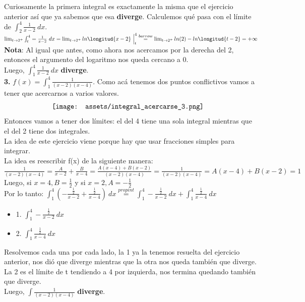 \documentclass[10pt,a4paper]{article}
\begin{document}
Curiosamente la primera integral es exactamente la misma que el ejercicio anterior así que ya sabemos que esa \textbf{diverge}. Calculemos qué pasa con el límite de $\int^{4}_{2} \frac{1}{x-2} \ dx$.\\
$\lim_{t \to 2^{+}} \int^{4}_{t} = \frac{1}{x-2} \ dx = \lim_{t \to 2^{+}} ln \longitud{x-2} \ \Big|^{4}_{t} \stackrel{barrow}{=} \lim_{t \to 2^{+}} ln(2) - ln \longitud{t-2} = + \infty $ \\
\textbf{Nota}: Al igual que antes, como ahora nos acercamos por la derecha del 2, entonces el argumento del logaritmo nos queda cercano a 0. \\
Luego, $\int^{4}_{1} \frac{1}{x-2} \ dx$ \textbf{diverge}. \\
\textbf{3.} $f(x) = \int^{4}_{1} \frac{1}{(x-2)(x-4)}$. Como acá tenemos dos puntos conflictivos vamos a tener que acercarnos a varios valores.
\[\begin{minipage}[b]{0.65\textwidth}
    \texttt{[image: assets/integral\_acercarse\_3.png]}
\end{minipage}\]
Entonces vamos a tener dos límites: el del 4 tiene una sola integral mientras que el del 2 tiene dos integrales. \\
La idea de este ejercicio viene porque hay que usar fracciones simples para integrar. \\
La idea es reescribir f(x) de la siguiente manera: $\frac{1}{(x-2)(x-4)} = \frac{A}{x-2} + \frac{B}{x-4} = \frac{A(x-4)+B(x-2)}{(x-2)(x-4)} = \frac{1}{(x-2)(x-4)} = A(x-4)+B(x-2) = 1$ \\
Luego, si $x = 4, B = \frac{1}{2}$ y si $x = 2, A = -\frac{1}{2}$ \\
Por lo tanto: $\int^{4}_{1} (-\frac{\frac{1}{2}}{x-2} + \frac{\frac{1}{2}}{x-4}) \ dx \stackrel{prop int}{=} \int^{4}_{1} -\frac{\frac{1}{2}}{x-2} \ dx + \int^{4}_{1} \frac{\frac{1}{2}}{x-4} \ dx$
\begin{itemize}
    \item 1. $\int^{4}_{1} -\frac{\frac{1}{2}}{x-2} \ dx$
    \item 2. $\int^{4}_{1} \frac{\frac{1}{2}}{x-4} \ dx$
\end{itemize}
Resolvemos cada una por cada lado, la 1 ya la tenemos resuelta del ejercicio anterior, nos dió que diverge mientras que la otra nos queda también que diverge. \\
La 2 es el límite de t tendiendo a 4 por izquierda, nos termina quedando también que diverge. \\
Luego, $\int \frac{1}{(x-2)(x-4)}$ \textbf{diverge}. \\
\end{document}
